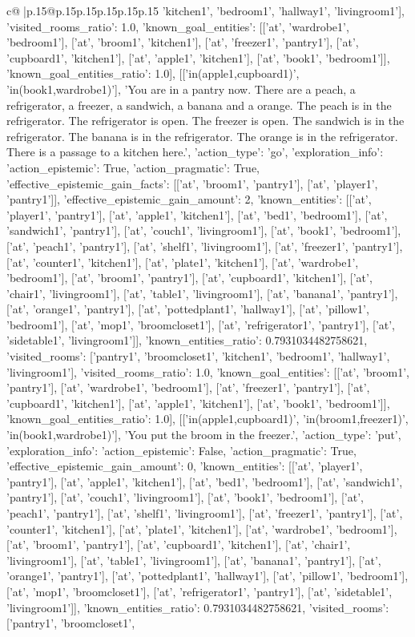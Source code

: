 \documentclass{article}
\begin{document}
{\begin{supertabular}{c@{$\;$}|p{.15\linewidth}@{}p{.15\linewidth}p{.15\linewidth}p{.15\linewidth}p{.15\linewidth}p{.15\linewidth}}
{{{'kitchen1', 'bedroom1', 'hallway1', 'livingroom1'], 'visited_rooms_ratio': 1.0, 'known_goal_entities': [['at', 'wardrobe1', 'bedroom1'], ['at', 'broom1', 'kitchen1'], ['at', 'freezer1', 'pantry1'], ['at', 'cupboard1', 'kitchen1'], ['at', 'apple1', 'kitchen1'], ['at', 'book1', 'bedroom1']], 'known_goal_entities_ratio': 1.0}}], [['in(apple1,cupboard1)', 'in(book1,wardrobe1)'], 'You are in a pantry now. There are a peach, a refrigerator, a freezer, a sandwich, a banana and a orange. The peach is in the refrigerator. The refrigerator is open. The freezer is open. The sandwich is in the refrigerator. The banana is in the refrigerator. The orange is in the refrigerator. There is a passage to a kitchen here.', {'action_type': 'go', 'exploration_info': {'action_epistemic': True, 'action_pragmatic': True, 'effective_epistemic_gain_facts': [['at', 'broom1', 'pantry1'], ['at', 'player1', 'pantry1']], 'effective_epistemic_gain_amount': 2, 'known_entities': [['at', 'player1', 'pantry1'], ['at', 'apple1', 'kitchen1'], ['at', 'bed1', 'bedroom1'], ['at', 'sandwich1', 'pantry1'], ['at', 'couch1', 'livingroom1'], ['at', 'book1', 'bedroom1'], ['at', 'peach1', 'pantry1'], ['at', 'shelf1', 'livingroom1'], ['at', 'freezer1', 'pantry1'], ['at', 'counter1', 'kitchen1'], ['at', 'plate1', 'kitchen1'], ['at', 'wardrobe1', 'bedroom1'], ['at', 'broom1', 'pantry1'], ['at', 'cupboard1', 'kitchen1'], ['at', 'chair1', 'livingroom1'], ['at', 'table1', 'livingroom1'], ['at', 'banana1', 'pantry1'], ['at', 'orange1', 'pantry1'], ['at', 'pottedplant1', 'hallway1'], ['at', 'pillow1', 'bedroom1'], ['at', 'mop1', 'broomcloset1'], ['at', 'refrigerator1', 'pantry1'], ['at', 'sidetable1', 'livingroom1']], 'known_entities_ratio': 0.7931034482758621, 'visited_rooms': ['pantry1', 'broomcloset1', 'kitchen1', 'bedroom1', 'hallway1', 'livingroom1'], 'visited_rooms_ratio': 1.0, 'known_goal_entities': [['at', 'broom1', 'pantry1'], ['at', 'wardrobe1', 'bedroom1'], ['at', 'freezer1', 'pantry1'], ['at', 'cupboard1', 'kitchen1'], ['at', 'apple1', 'kitchen1'], ['at', 'book1', 'bedroom1']], 'known_goal_entities_ratio': 1.0}}], [['in(apple1,cupboard1)', 'in(broom1,freezer1)', 'in(book1,wardrobe1)'], 'You put the broom in the freezer.', {'action_type': 'put', 'exploration_info': {'action_epistemic': False, 'action_pragmatic': True, 'effective_epistemic_gain_amount': 0, 'known_entities': [['at', 'player1', 'pantry1'], ['at', 'apple1', 'kitchen1'], ['at', 'bed1', 'bedroom1'], ['at', 'sandwich1', 'pantry1'], ['at', 'couch1', 'livingroom1'], ['at', 'book1', 'bedroom1'], ['at', 'peach1', 'pantry1'], ['at', 'shelf1', 'livingroom1'], ['at', 'freezer1', 'pantry1'], ['at', 'counter1', 'kitchen1'], ['at', 'plate1', 'kitchen1'], ['at', 'wardrobe1', 'bedroom1'], ['at', 'broom1', 'pantry1'], ['at', 'cupboard1', 'kitchen1'], ['at', 'chair1', 'livingroom1'], ['at', 'table1', 'livingroom1'], ['at', 'banana1', 'pantry1'], ['at', 'orange1', 'pantry1'], ['at', 'pottedplant1', 'hallway1'], ['at', 'pillow1', 'bedroom1'], ['at', 'mop1', 'broomcloset1'], ['at', 'refrigerator1', 'pantry1'], ['at', 'sidetable1', 'livingroom1']], 'known_entities_ratio': 0.7931034482758621, 'visited_rooms': ['pantry1', 'broomcloset1', }}}
\end{supertabular}}
\end{document}
